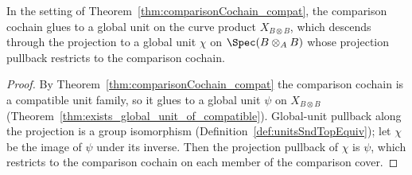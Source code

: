 \begin{theorem}
  \label{thm:exists_comparison_unit}
  \leanok
  In the setting of Theorem~\ref{thm:comparisonCochain_compat}, the comparison cochain glues to
  a global unit on the curve product \(X_{B \otimes B}\), which descends through the projection
  to a global unit \(\chi\) on \(\Spec(B \otimes_A B)\) whose projection pullback restricts to
  the comparison cochain.
\end{theorem}
\begin{proof}
  \leanok
  By Theorem~\ref{thm:comparisonCochain_compat} the comparison cochain is a compatible unit
  family, so it glues to a global unit \(\psi\) on \(X_{B \otimes B}\)
  (Theorem~\ref{thm:exists_global_unit_of_compatible}). Global-unit pullback along the
  projection is a group isomorphism (Definition~\ref{def:unitsSndTopEquiv}); let \(\chi\) be the
  image of \(\psi\) under its inverse. Then the projection pullback of \(\chi\) is \(\psi\),
  which restricts to the comparison cochain on each member of the comparison cover.
\end{proof}

